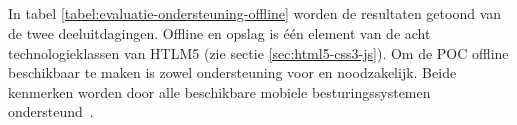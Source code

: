 % 
% 
% 
% 


\subsection{}
\label{sec:evaluatie-ondersteuning-offline}

In tabel \ref{tabel:evaluatie-ondersteuning-offline} worden de resultaten getoond van de twee deeluitdagingen.
Offline en opslag is één element van de acht technologieklassen van HTLM5 (zie sectie \ref{sec:html5-css3-js}).
Om de POC offline beschikbaar te maken is zowel ondersteuning voor  en  noodzakelijk.
Beide kenmerken worden door alle beschikbare mobiele besturingssystemen ondersteund~\cite{Deveria2013c}. 



